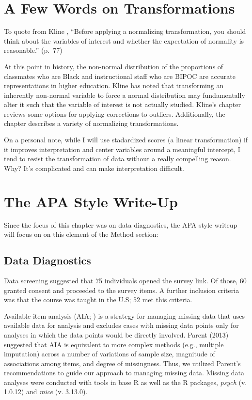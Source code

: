 \documentclass[
]{book}
\begin{document}
\hypertarget{a-few-words-on-transformations}{%
\section{A Few Words on Transformations}\label{a-few-words-on-transformations}}

To quote from Kline \citeyearpar{kline_principles_2016}, ``Before applying a normalizing transformation, you should think about the variables of interest and whether the expectation of normality is reasonable.'' (p.~77)

At this point in history, the non-normal distribution of the proportions of classmates who are Black and instructional staff who are BIPOC are accurate representations in higher education. Kline \citeyearpar{kline_principles_2016} has noted that transforming an inherently non-normal variable to force a normal distribution may fundamentally alter it such that the variable of interest is not actually studied. Kline's chapter reviews some options for applying corrections to outliers. Additionally, the chapter describes a variety of normalizing transformations.

On a personal note, while I will use stadardized scores (a linear transformation) if it improves interpretation and center variables around a meaningful intercept, I tend to resist the transformation of data without a really compelling reason. Why? It's complicated and can make interpretation difficult.

\hypertarget{the-apa-style-write-up-1}{%
\section{The APA Style Write-Up}\label{the-apa-style-write-up-1}}

Since the focus of this chapter was on data diagnostics, the APA style writeup will focus on on this element of the Method section:

\hypertarget{data-diagnostics}{%
\subsection{Data Diagnostics}\label{data-diagnostics}}

Data screening suggested that 75 individuals opened the survey link. Of those, 60 granted consent and proceeded to the survey items. A further inclusion criteria was that the course was taught in the U.S; 52 met this criteria.

Available item analysis (AIA; \citep{parent_handling_2013}) is a strategy for managing missing data that uses available data for analysis and excludes cases with missing data points only for analyses in which the data points would be directly involved. Parent (2013) suggested that AIA is equivalent to more complex methods (e.g., multiple imputation) across a number of variations of sample size, magnitude of associations among items, and degree of missingness. Thus, we utilized Parent's recommendations to guide our approach to managing missing data. Missing data analyses were conducted with tools in base R as well as the R packages, \emph{psych} (v. 1.0.12) and \emph{mice} (v. 3.13.0).
\end{document}
